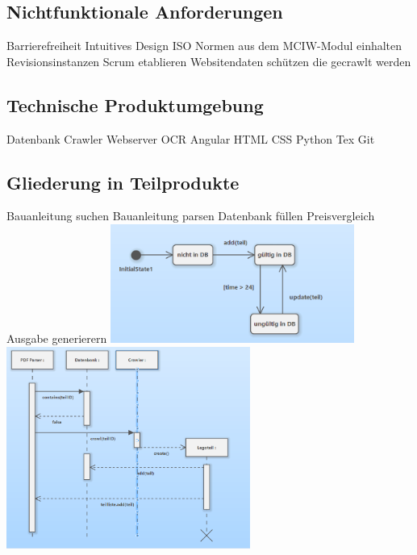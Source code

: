 \subsection{Nichtfunktionale Anforderungen}
Barrierefreiheit \newline
Intuitives Design \newline
ISO Normen aus dem MCIW-Modul einhalten \newline
Revisionsinstanzen Scrum etablieren \newline
Websitendaten schützen die gecrawlt werden \newline

\subsection{Technische Produktumgebung}
Datenbank \newline
Crawler \newline
Webserver \newline
OCR \newline
Angular \newline
HTML \newline
CSS \newline
Python \newline
Tex \newline
Git \newline

\subsection{Gliederung in Teilprodukte}
Bauanleitung suchen \newline
Bauanleitung parsen \newline
Datenbank füllen \newline
Preisvergleich \newline
Ausgabe generierern \newline
\includegraphics[width=8cm]{pictures/datenbankupdate.png} \newline  \newline
\includegraphics[width=8cm]{pictures/vorgaenge.png}



